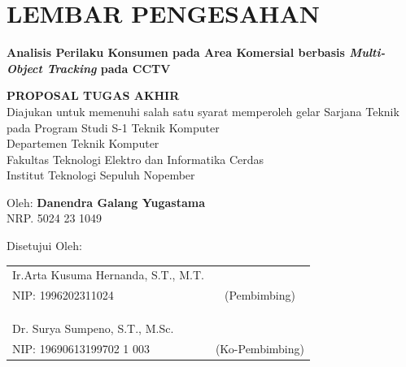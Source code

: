 \chapter*{LEMBAR PENGESAHAN}

\thispagestyle{empty}

\begin{center}
  \textbf{Analisis Perilaku Konsumen pada Area Komersial berbasis \textit{Multi-Object Tracking} pada CCTV}
\end{center}

\begingroup
\small

\begin{center}
  \textbf{PROPOSAL TUGAS AKHIR} \\
  Diajukan untuk memenuhi salah satu syarat memperoleh gelar
  Sarjana Teknik pada
  Program Studi S-1 Teknik Komputer \\
  Departemen Teknik Komputer \\
  Fakultas Teknologi Elektro dan Informatika Cerdas \\
  Institut Teknologi Sepuluh Nopember
\end{center}

\begin{center}
  Oleh: \textbf{Danendra Galang Yugastama} \\
  NRP. 5024 23 1049
\end{center}

\begin{center}
  Disetujui Oleh:
\end{center}

\vspace{10ex}

\begingroup
\setlength{\tabcolsep}{0pt}

\noindent
\begin{tabularx}{\textwidth}{X c}
  Ir.Arta Kusuma Hernanda, S.T., M.T.      &                 \\
  NIP: 1996202311024    & (Pembimbing)    \\
                                &                 \\
                                &                 \\
                                &                 \\
  Dr. Surya Sumpeno, S.T., M.Sc. &                 \\
  NIP: 19690613199702 1 003    & (Ko-Pembimbing) \\
\end{tabularx}
\endgroup

